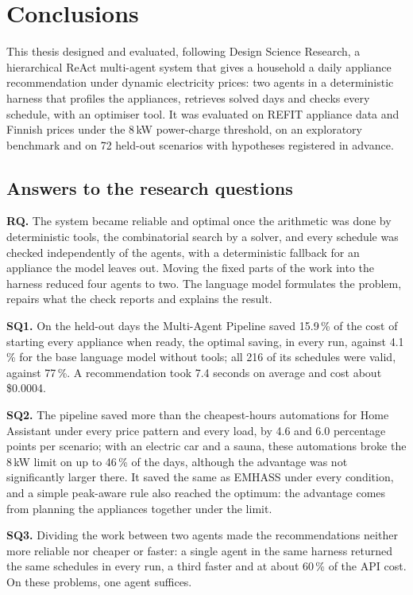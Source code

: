 \documentclass[12pt,a4paper]{report}
\begin{document}
\chapter{Conclusions}
\label{ch:conclusions}

This thesis designed and evaluated, following Design Science Research,
a hierarchical ReAct multi-agent system that gives a household a daily
appliance recommendation under dynamic electricity prices: two agents
in a deterministic harness that profiles the appliances, retrieves
solved days and checks every schedule, with an optimiser tool. It was
evaluated on REFIT appliance data and Finnish prices under the 8\,kW
power-charge threshold, on an exploratory benchmark and on 72 held-out
scenarios with hypotheses registered in advance.

\section{Answers to the research questions}

\textbf{RQ.} The system became reliable and optimal once the arithmetic
was done by deterministic tools, the combinatorial search by a solver,
and every schedule was checked independently of the agents, with a
deterministic fallback for an appliance the model leaves out. Moving the
fixed parts of the work into the harness reduced four agents to two. The
language model formulates the problem, repairs what the check reports
and explains the result.

\textbf{SQ1.} On the held-out days the Multi-Agent Pipeline saved
15.9\,\% of the cost of starting every appliance when ready, the optimal
saving, in every run, against 4.1\,\% for the base language model
without tools; all 216 of its schedules were valid, against 77\,\%. A
recommendation took 7.4 seconds on average and cost about \$0.0004.

\textbf{SQ2.} The pipeline saved more than the cheapest-hours
automations for Home Assistant under every price pattern and every load,
by 4.6 and 6.0 percentage points per scenario; with an electric car and
a sauna, these automations broke the 8\,kW limit on up to 46\,\% of the
days, although the advantage was not significantly larger there. It
saved the same as EMHASS under every condition, and a simple peak-aware
rule also reached the optimum: the advantage comes from planning the
appliances together under the limit.

\textbf{SQ3.} Dividing the work between two agents made the
recommendations neither more reliable nor cheaper or faster: a single
agent in the same harness returned the same schedules in every run, a
third faster and at about 60\,\% of the API cost. On these problems, one
agent suffices.
\end{document}
